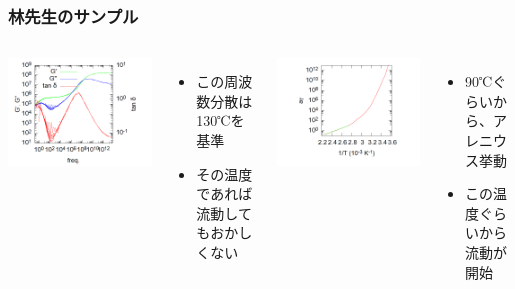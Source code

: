 \documentclass[1４pt, dvipdfmx]{beamer}
\begin{document}
\begin{frame}
	\frametitle{林先生のサンプル}
		\begin{columns}[T, onlytextwidth]
			\centering
				\includegraphics[width=\textwidth]{sample_1.png}

				\begin{itemize}
					\item この周波数分散は130℃を基準
					\item その温度であれば流動してもおかしくない
				\end{itemize}
			\centering
			\includegraphics[width=\textwidth]{sample_1_sf.png}

			\begin{itemize}
				\item 90℃ぐらいから、アレニウス挙動
				\item この温度ぐらいから流動が開始
			\end{itemize}
		\end{columns}
\end{frame}
\end{document}
